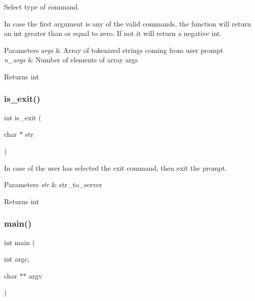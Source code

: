 Select type of command. 

In case the first argument is any of the valid commands, the function will return an int greater than or equal to zero. If not it will return a negative int. 
\begin{DoxyParams}{Parameters}
{\em args} & Array of tokenized strings coming from user prompt \\
\hline
{\em n\+\_\+args} & Number of elements of array args \\
\hline
\end{DoxyParams}
\begin{DoxyReturn}{Returns}
int 
\end{DoxyReturn}
\mbox{\label{bash_8c_a9882fc592454588fc3587f2ec03e09ab}} 
\subsubsection{is\+\_\+exit()}
{\footnotesize\ttfamily int is\+\_\+exit (\begin{DoxyParamCaption}\item[{char $\ast$}]{str }\end{DoxyParamCaption})}



In case of the user has selected the exit command, then exit the prompt. 


\begin{DoxyParams}{Parameters}
{\em str} & str\+\_\+to\+\_\+server \\
\hline
\end{DoxyParams}
\begin{DoxyReturn}{Returns}
int 
\end{DoxyReturn}
\mbox{\label{bash_8c_a3c04138a5bfe5d72780bb7e82a18e627}} 
\subsubsection{main()}
{\footnotesize\ttfamily int main (\begin{DoxyParamCaption}\item[{int}]{argc,  }\item[{char $\ast$$\ast$}]{argv }\end{DoxyParamCaption})}

\mbox{\label{bash_8c_aebbd74c2b146ed63fce0a0314388ada9}} 
